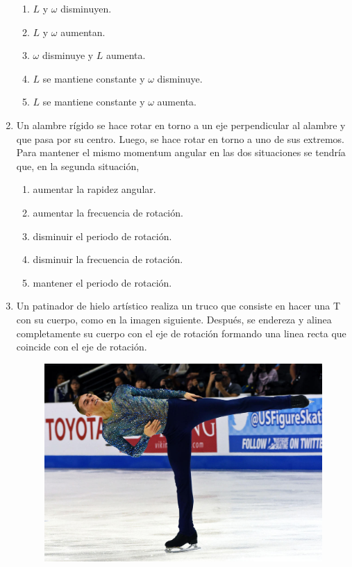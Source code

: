 \documentclass[letterpaper]{article}
\begin{document}
\begin{enumerate}
\begin{enumerate}[label=\Alph*)]
\item $L$ y $\omega$ disminuyen.
\item $L$ y $\omega$ aumentan.
\item $\omega$ disminuye y $L$ aumenta.
\item $L$ se mantiene constante y $\omega$ disminuye.
\item $L$ se mantiene constante y $\omega$ aumenta.
\end{enumerate}

\item Un alambre rígido se hace rotar en torno a un eje perpendicular al alambre y que pasa por su centro. Luego, se hace rotar en torno a uno de sus extremos. Para mantener el mismo momentum angular en las dos situaciones se tendría que, en la segunda situación,

\begin{enumerate}[label=\Alph*)]
\item aumentar la rapidez angular.
\item aumentar la frecuencia de rotación.
\item disminuir el periodo de rotación.
\item disminuir la frecuencia de rotación.
\item mantener el periodo de rotación.
\end{enumerate}

\item Un patinador de hielo artístico realiza un truco que consiste en hacer una T con su cuerpo, como en la imagen siguiente. Después, se endereza y alinea completamente su cuerpo con el eje de rotación formando una linea recta que coincide con el eje de rotación.

\begin{figure}[h]
\centering
\includegraphics[scale=0.3]{adam.jpg}
\end{figure}


\end{enumerate}
\end{document}
